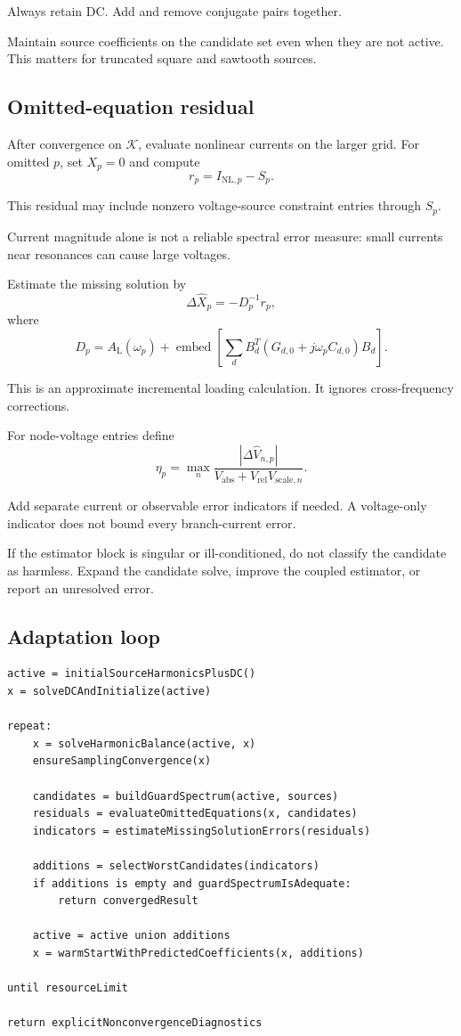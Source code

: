 \documentclass[11pt,a4paper]{article}
\begin{document}
Always retain DC. Add and remove conjugate pairs together.

Maintain source coefficients on the candidate set even when they are
not active. This matters for truncated square and sawtooth sources.

\subsection{Omitted-equation residual}

After convergence on $\mathcal K$, evaluate nonlinear currents on the
larger grid. For omitted $p$, set $X_p=0$ and compute
\[
 \boxed{r_p=I_{\mathrm{NL},p}-S_p.}
\]

This residual may include nonzero voltage-source constraint entries
through $S_p$.

Current magnitude alone is not a reliable spectral error measure:
small currents near resonances can cause large voltages.

Estimate the missing solution by
\[
 \Delta\widehat X_p=-D_p^{-1}r_p,
\]
where
\[
 D_p=A_{\mathrm L}(\omega_p)
 +\operatorname{embed}
 \left[
 \sum_d B_d^T(G_{d,0}+j\omega_pC_{d,0})B_d
 \right].
\]

This is an approximate incremental loading calculation. It ignores
cross-frequency corrections.

For node-voltage entries define
\[
 \eta_p=
 \max_n
 \frac{|\Delta\widehat V_{n,p}|}
 {V_{\mathrm{abs}}+V_{\mathrm{rel}}V_{\mathrm{scale},n}}.
\]

Add separate current or observable error indicators if needed.
A voltage-only indicator does not bound every branch-current error.

If the estimator block is singular or ill-conditioned, do not classify
the candidate as harmless. Expand the candidate solve, improve the
coupled estimator, or report an unresolved error.

\subsection{Adaptation loop}

\begin{lstlisting}
active = initialSourceHarmonicsPlusDC()
x = solveDCAndInitialize(active)

repeat:
    x = solveHarmonicBalance(active, x)
    ensureSamplingConvergence(x)

    candidates = buildGuardSpectrum(active, sources)
    residuals = evaluateOmittedEquations(x, candidates)
    indicators = estimateMissingSolutionErrors(residuals)

    additions = selectWorstCandidates(indicators)
    if additions is empty and guardSpectrumIsAdequate:
        return convergedResult

    active = active union additions
    x = warmStartWithPredictedCoefficients(x, additions)

until resourceLimit

return explicitNonconvergenceDiagnostics
\end{lstlisting}
\end{document}
